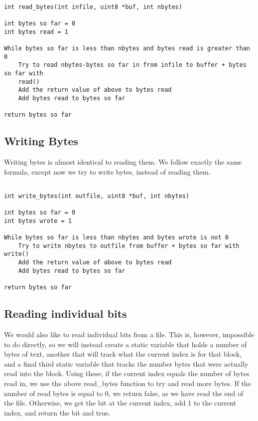 \documentclass[11pt]{article}
\begin{document}
\begin{verbatim}

int read_bytes(int infile, uint8 *buf, int nbytes)

int bytes so far = 0
int bytes read = 1

While bytes so far is less than nbytes and bytes read is greater than 0
    Try to read nbytes-bytes so far in from infile to buffer + bytes so far with
    read()
    Add the return value of above to bytes read
    Add bytes read to bytes so far

return bytes so far

\end{verbatim}

\subsection{Writing Bytes}

Writing bytes is almost identical to reading them. We follow exactly the same formula, except now we try to write bytes, instead of reading them.

\begin{verbatim}

int write_bytes(int outfile, uint8 *buf, int nbytes)

int bytes so far = 0
int bytes wrote = 1

While bytes so far is less than nbytes and bytes wrote is not 0
    Try to write nbytes to outfile from buffer + bytes so far with write()
    Add the return value of above to bytes read
    Add bytes read to bytes so far

return bytes so far

\end{verbatim}

\subsection{Reading individual bits}

We would also like to read individual bits from a file. This is, however, impossible to do directly, so we will instead create a static variable that holds a number of bytes of text, another that will track what the current index is for that block, and a final third static variable that tracks the number bytes that were actually read into the block. Using these, if the current index equals the number of bytes read in, we use the above read\_bytes function to try and read more bytes. If the number of read bytes is equal to 0, we return false, as we have read the end of the file. Otherwise, we get the bit at the current index, add 1 to the current index, and return the bit and true.
\end{document}
